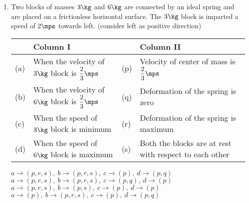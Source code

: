 \documentclass{article}
\renewcommand{\ans}{\quad}
\begin{document}
\begin{enumerate}
    \item Two blocks of masses $3 \kg$ and $6 \kg$ are connected by an ideal spring and are placed on a frictionless horizontal surface. The $3 \kg$ block is imparted a speed of $2 \mps$ towards left. (consider left as positive direction)
    \begin{center}
    \end{center}
    \begin{center}
        \renewcommand{\arraystretch}{2}
        \begin{table}[h]
            \centering
            \begin{tabular}{p{0.25cm}p{7cm}|p{0.25cm}p{6cm}}
            \hline
            & Column I & &Column II \\
            \hline
            (a)& When the velocity of $3\kg$ block is $\dfrac{2}{3}\mps$ & (p) &Velocity of center of mass is $\dfrac{2}{3}\mps$\\
            (b)& When the velocity of $6\kg$ block is $\dfrac{2}{3}\mps$ & (q) &Deformation of the spring is zero\\
            (c)& When the speed of $3\kg$ block is minimum  & (r) &Deformation of the spring is maximum\\
            (d)& When the speed of $6\kg$ block is maximum & (s) &Both the blocks are at rest with respect to each other\\
            \hline
            \end{tabular}
        \end{table}
    \end{center}
    \begin{tasks}
        \task $a \rightarrow (p,r,s), ~b \rightarrow (p,r,s), ~c \rightarrow (p), ~ d\rightarrow (p,q)$\ans
        \task $a \rightarrow (p,r,s), ~b \rightarrow (p,r,s), ~c \rightarrow (p,q), ~ d\rightarrow (p)$
        \task $a \rightarrow (p,r,s), ~b \rightarrow (p,s), ~c \rightarrow (p), ~ d\rightarrow (p)$
        \task $a \rightarrow (p), ~b \rightarrow (p,r,s), ~c \rightarrow (p), ~ d\rightarrow (p,q)$
    \end{tasks}
    

\end{enumerate}
\end{document}
